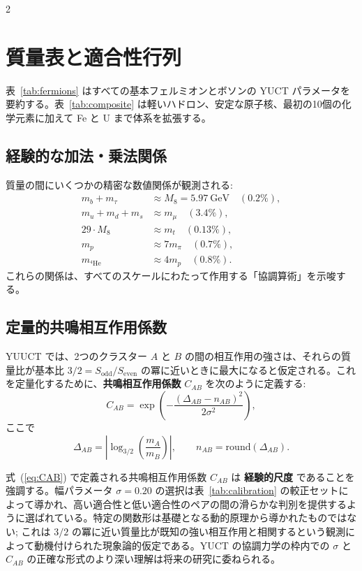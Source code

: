 \documentclass[11pt,a4paper]{article}
\theoremstyle{remark}
\begin{document}
	\begin{multicols}{2}
		
		\section{質量表と適合性行列}
		\label{sec:tables}
		
		表~\ref{tab:fermions} はすべての基本フェルミオンとボソンの YUCT パラメータを要約する。表~\ref{tab:composite} は軽いハドロン、安定な原子核、最初の10個の化学元素に加えて Fe と U まで体系を拡張する。
		
		\subsection{経験的な加法・乗法関係}
		
		質量の間にいくつかの精密な数値関係が観測される:
		\begin{align*}
			m_b + m_\tau &\approx M_8 = 5.97\ \text{GeV} \quad (0.2\%),\\
			m_u + m_d + m_s &\approx m_\mu \quad (3.4\%),\\
			29 \cdot M_8 &\approx m_t \quad (0.13\%),\\
			m_p &\approx 7 m_\pi \quad (0.7\%),\\
			m_{^4\mathrm{He}} &\approx 4 m_p \quad (0.8\%).
		\end{align*}
		これらの関係は、すべてのスケールにわたって作用する「協調算術」を示唆する。
		
		\subsection{定量的共鳴相互作用係数}
		
		YUUCT では、2つのクラスター \(A\) と \(B\) の間の相互作用の強さは、それらの質量比が基本比 \(3/2 = S_{\mathrm{odd}}/S_{\mathrm{even}}\) の冪に近いときに最大になると仮定される。これを定量化するために、\textbf{共鳴相互作用係数} \(C_{AB}\) を次のように定義する:
		\begin{equation}
			C_{AB} = \exp\left( - \frac{(\Delta_{AB} - n_{AB})^2}{2\sigma^2} \right),
			\label{eq:CAB}
		\end{equation}
		ここで
		\[
		\Delta_{AB} = \left| \log_{3/2}\left( \frac{m_A}{m_B} \right) \right|, \qquad n_{AB} = \text{round}(\Delta_{AB}).
		\]
		
		式~(\ref{eq:CAB}) で定義される共鳴相互作用係数 \(C_{AB}\) は \textbf{経験的尺度} であることを強調する。幅パラメータ \(\sigma = 0.20\) の選択は表~\ref{tab:calibration} の較正セットによって導かれ、高い適合性と低い適合性のペアの間の滑らかな判別を提供するように選ばれている。特定の関数形は基礎となる動的原理から導かれたものではない; これは \(3/2\) の冪に近い質量比が既知の強い相互作用と相関するという観測によって動機付けられた現象論的仮定である。YUCT の協調力学の枠内での \(\sigma\) と \(C_{AB}\) の正確な形式のより深い理解は将来の研究に委ねられる。
		

\end{multicols}
\end{document}

